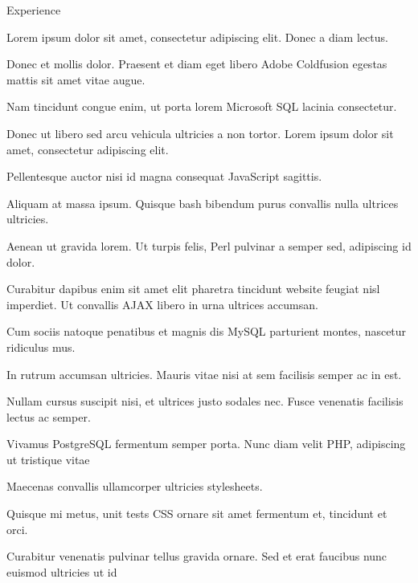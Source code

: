 \documentclass{resume} %
\begin{document}
\begin{rSection}{Experience}

\item Lorem ipsum dolor sit amet, consectetur adipiscing elit. Donec a diam lectus.
\item Donec et mollis dolor. Praesent et diam eget libero Adobe Coldfusion egestas mattis sit amet vitae augue.
\item Nam tincidunt congue enim, ut porta lorem Microsoft SQL lacinia consectetur.
\item Donec ut libero sed arcu vehicula ultricies a non tortor. Lorem ipsum dolor sit amet, consectetur adipiscing elit.
\item Pellentesque auctor nisi id magna consequat JavaScript sagittis.
\item Aliquam at massa ipsum. Quisque bash bibendum purus convallis nulla ultrices ultricies.


\item Aenean ut gravida lorem. Ut turpis felis, Perl pulvinar a semper sed, adipiscing id dolor.
\item Curabitur dapibus enim sit amet elit pharetra tincidunt website feugiat nisl imperdiet. Ut convallis AJAX libero in urna ultrices accumsan.
\item Cum sociis natoque penatibus et magnis dis MySQL parturient montes, nascetur ridiculus mus.
\item In rutrum accumsan ultricies. Mauris vitae nisi at sem facilisis semper ac in est.
\item Nullam cursus suscipit nisi, et ultrices justo sodales nec. Fusce venenatis facilisis lectus ac semper.


\item Vivamus PostgreSQL fermentum semper porta. Nunc diam velit PHP, adipiscing ut tristique vitae
\item Maecenas convallis ullamcorper ultricies stylesheets.
\item Quisque mi metus, unit tests CSS ornare sit amet fermentum et, tincidunt et orci.
\item Curabitur venenatis pulvinar tellus gravida ornare. Sed et erat faucibus nunc euismod ultricies ut id

\end{rSection}

\end{document}
